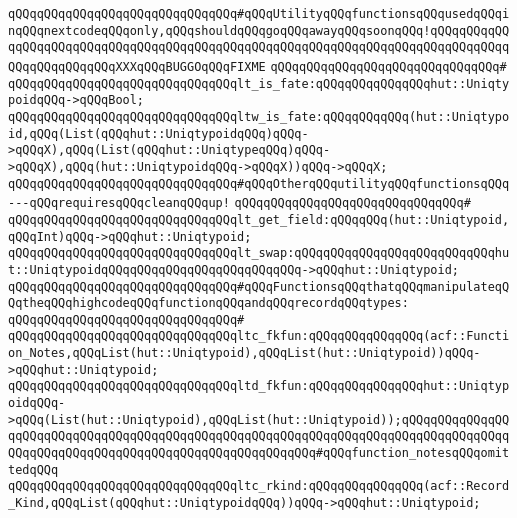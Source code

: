 \newline
\verb|qQQqqQQqqQQqqQQqqQQqqQQqqQQqqQQq#qQQqUtilityqQQqfunctionsqQQqusedqQQqinqQQqnextcodeqQQqonly,qQQqshouldqQQqgoqQQqawayqQQqsoonqQQq!qQQqqQQqqQQqqQQqqQQqqQQqqQQqqQQqqQQqqQQqqQQqqQQqqQQqqQQqqQQqqQQqqQQqqQQqqQQqqQQqqQQqqQQqqQQqqQQqXXXqQQqBUGGOqQQqFIXME|\newline
\verb|qQQqqQQqqQQqqQQqqQQqqQQqqQQqqQQq#|\newline
\verb|qQQqqQQqqQQqqQQqqQQqqQQqqQQqqQQqlt_is_fate:qQQqqQQqqQQqqQQqhut::UniqtypoidqQQq->qQQqBool;|\newline
\verb|qQQqqQQqqQQqqQQqqQQqqQQqqQQqqQQqltw_is_fate:qQQqqQQqqQQq(hut::Uniqtypoid,qQQq(List(qQQqhut::UniqtypoidqQQq)qQQq->qQQqX),qQQq(List(qQQqhut::UniqtypeqQQq)qQQq->qQQqX),qQQq(hut::UniqtypoidqQQq->qQQqX))qQQq->qQQqX;|\newline
\newline
\verb|qQQqqQQqqQQqqQQqqQQqqQQqqQQqqQQq#qQQqOtherqQQqutilityqQQqfunctionsqQQq---qQQqrequiresqQQqcleanqQQqup!|\newline
\verb|qQQqqQQqqQQqqQQqqQQqqQQqqQQqqQQq#|\newline
\verb|qQQqqQQqqQQqqQQqqQQqqQQqqQQqqQQqlt_get_field:qQQqqQQq(hut::Uniqtypoid,qQQqInt)qQQq->qQQqhut::Uniqtypoid;|\newline
\verb|qQQqqQQqqQQqqQQqqQQqqQQqqQQqqQQqlt_swap:qQQqqQQqqQQqqQQqqQQqqQQqqQQqhut::UniqtypoidqQQqqQQqqQQqqQQqqQQqqQQqqQQq->qQQqhut::Uniqtypoid;|\newline
\newline
\verb|qQQqqQQqqQQqqQQqqQQqqQQqqQQqqQQq#qQQqFunctionsqQQqthatqQQqmanipulateqQQqtheqQQqhighcodeqQQqfunctionqQQqandqQQqrecordqQQqtypes:|\newline
\verb|qQQqqQQqqQQqqQQqqQQqqQQqqQQqqQQq#|\newline
\verb|qQQqqQQqqQQqqQQqqQQqqQQqqQQqqQQqltc_fkfun:qQQqqQQqqQQqqQQq(acf::Function_Notes,qQQqList(hut::Uniqtypoid),qQQqList(hut::Uniqtypoid))qQQq->qQQqhut::Uniqtypoid;|\newline
\verb|qQQqqQQqqQQqqQQqqQQqqQQqqQQqqQQqltd_fkfun:qQQqqQQqqQQqqQQqhut::UniqtypoidqQQq->qQQq(List(hut::Uniqtypoid),qQQqList(hut::Uniqtypoid));qQQqqQQqqQQqqQQqqQQqqQQqqQQqqQQqqQQqqQQqqQQqqQQqqQQqqQQqqQQqqQQqqQQqqQQqqQQqqQQqqQQqqQQqqQQqqQQqqQQqqQQqqQQqqQQqqQQqqQQqqQQqqQQq#qQQqfunction_notesqQQqomittedqQQq|\newline
\newline
\verb|qQQqqQQqqQQqqQQqqQQqqQQqqQQqqQQqltc_rkind:qQQqqQQqqQQqqQQq(acf::Record_Kind,qQQqList(qQQqhut::UniqtypoidqQQq))qQQq->qQQqhut::Uniqtypoid;|\newline
